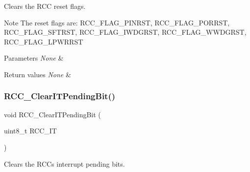 Clears the R\+CC reset flags. 

\begin{DoxyNote}{Note}
The reset flags are\+: R\+C\+C\+\_\+\+F\+L\+A\+G\+\_\+\+P\+I\+N\+R\+ST, R\+C\+C\+\_\+\+F\+L\+A\+G\+\_\+\+P\+O\+R\+R\+ST, R\+C\+C\+\_\+\+F\+L\+A\+G\+\_\+\+S\+F\+T\+R\+ST, R\+C\+C\+\_\+\+F\+L\+A\+G\+\_\+\+I\+W\+D\+G\+R\+ST, R\+C\+C\+\_\+\+F\+L\+A\+G\+\_\+\+W\+W\+D\+G\+R\+ST, R\+C\+C\+\_\+\+F\+L\+A\+G\+\_\+\+L\+P\+W\+R\+R\+ST 
\end{DoxyNote}

\begin{DoxyParams}{Parameters}
{\em None} & \\
\hline
\end{DoxyParams}

\begin{DoxyRetVals}{Return values}
{\em None} & \\
\hline
\end{DoxyRetVals}
\mbox{\label{group___r_c_c___private___functions_ga529842d165910f8f87e26115da36089b}} 
\subsubsection{\texorpdfstring{RCC\_ClearITPendingBit()}{RCC\_ClearITPendingBit()}}
{\footnotesize\ttfamily void R\+C\+C\+\_\+\+Clear\+I\+T\+Pending\+Bit (\begin{DoxyParamCaption}\item[{uint8\+\_\+t}]{R\+C\+C\+\_\+\+IT }\end{DoxyParamCaption})}



Clears the R\+CC\textquotesingle{}s interrupt pending bits. 


